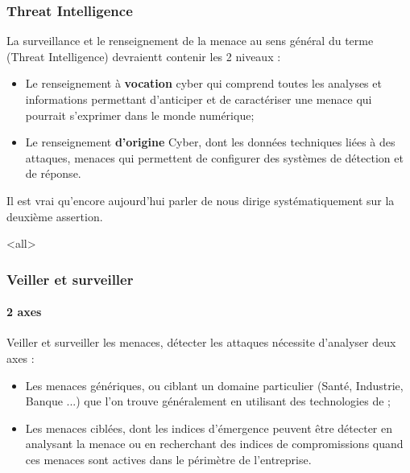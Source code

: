 \begin{frame}
\frametitle<presentation>{Threat Intelligence}
La surveillance et le renseignement de la menace au sens général du terme (Threat Intelligence) devraientt contenir les 2 niveaux :

\begin{itemize}
  \item Le renseignement à \textbf{vocation} cyber qui comprend toutes les analyses et informations permettant d'anticiper et de caractériser une menace qui pourrait s'exprimer dans le monde numérique;
  \item Le renseignement \textbf{d'origine} Cyber, dont les données techniques liées à des attaques, menaces qui permettent de configurer des systèmes de détection et de réponse.
\end{itemize}
\end{frame}


Il est vrai qu'encore aujourd'hui parler de  nous dirige systématiquement sur la deuxième assertion.


\mode<all>{}

\begin{frame}
\frametitle<presentation>{Veiller et surveiller}
\framesubtitle<presentation>{2 axes}

Veiller et surveiller les menaces, détecter les attaques  nécessite d'analyser deux axes : 

\begin{itemize}
  \item Les menaces génériques, ou ciblant un domaine  particulier (Santé, Industrie, Banque ...) que l'on trouve généralement en utilisant des technologies de ; 
  \item Les menaces ciblées, dont les indices d'émergence peuvent être détecter en analysant la menace ou  en recherchant des indices de compromissions quand ces menaces sont actives dans le périmètre de l'entreprise.  
\end{itemize}
\end{frame}




